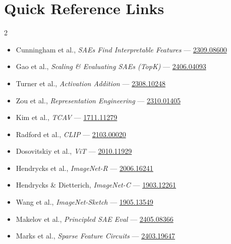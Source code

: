 \documentclass[11pt]{article}
\begin{document}
\section{Quick Reference Links}

\begin{multicols}{2}
\begin{itemize}[leftmargin=1.2em,itemsep=0pt]
  \item Cunningham et al., \emph{SAEs Find Interpretable Features} ---
    \href{https://arxiv.org/abs/2309.08600}{2309.08600}
  \item Gao et al., \emph{Scaling \& Evaluating SAEs (TopK)} ---
    \href{https://arxiv.org/abs/2406.04093}{2406.04093}
  \item Turner et al., \emph{Activation Addition} ---
    \href{https://arxiv.org/abs/2308.10248}{2308.10248}
  \item Zou et al., \emph{Representation Engineering} ---
    \href{https://arxiv.org/abs/2310.01405}{2310.01405}
  \item Kim et al., \emph{TCAV} ---
    \href{https://arxiv.org/abs/1711.11279}{1711.11279}
  \item Radford et al., \emph{CLIP} ---
    \href{https://arxiv.org/abs/2103.00020}{2103.00020}
  \item Dosovitskiy et al., \emph{ViT} ---
    \href{https://arxiv.org/abs/2010.11929}{2010.11929}
  \item Hendrycks et al., \emph{ImageNet-R} ---
    \href{https://arxiv.org/abs/2006.16241}{2006.16241}
  \item Hendrycks \& Dietterich, \emph{ImageNet-C} ---
    \href{https://arxiv.org/abs/1903.12261}{1903.12261}
  \item Wang et al., \emph{ImageNet-Sketch} ---
    \href{https://arxiv.org/abs/1905.13549}{1905.13549}
  \item Makelov et al., \emph{Principled SAE Eval} ---
    \href{https://arxiv.org/abs/2405.08366}{2405.08366}
  \item Marks et al., \emph{Sparse Feature Circuits} ---
    \href{https://arxiv.org/abs/2403.19647}{2403.19647}
\end{itemize}
\end{multicols}
\end{document}
